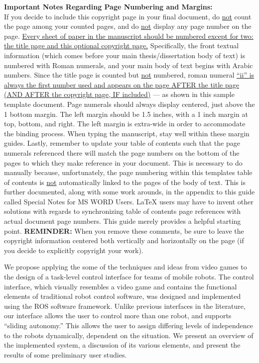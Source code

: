 \begin{thesiscopyrightpage}
\begin{singlespace}
{\small \textbf{Important Notes Regarding Page Numbering and Margins:}} \\
If you decide to include this copyright page in your final document, do
\uline{not} count the page among your counted pages, and do \uline{not} display
any page number on the page.  \uline{Every sheet of paper in the manuscript
should be numbered except for two:  the title page and this optional copyright
page.}  Specifically, the front textual information (which comes before your
main thesis/dissertation body of text) is numbered with Roman numerals, and
your main body of text begins with Arabic numbers.  Since the title page is
counted but \uline{not} numbered, roman numeral \uline{``ii'' is always the
first number used and appears on the page AFTER the title page (AND AFTER the
copyright page, IF included)} --- as shown in this sample template document.
Page numerals should always display centered, just above the 1 bottom margin.
The left margin should be 1.5 inches, with a 1 inch margin at top, bottom, and
right.  The left margin is extra-wide in order to accommodate the binding
process.  When typing the manuscript, stay well within these margin guides.
Lastly, remember to update your table of contents such that the page numerals
referenced there will match the page numbers on the bottom of the pages to
which they make reference in your document.  This is necessary to do manually
because, unfortunately, the page numbering within this templates table of
contents is \uline{not} automatically linked to the pages of the body of text.
This is further documented, along with some work arounds, in the appendix to
this guide called Special Notes for MS WORD Users.  \LaTeX{} users may have to
invent other solutions with regards to synchronizing table of contents page
references with actual document page numbers.  This guide merely provides a
helpful starting point.  \textbf{REMINDER:} When you remove these comments, be
sure to leave the copyright information centered both vertically and
horizontally on the page (if you decide to explicitly copyright your work).
\end{singlespace}
\fi
\end{thesiscopyrightpage}

\begin{thesisabstract}
We propose applying the some of the techniques and ideas from video games to the design of a task-level control interface for teams of mobile robots.  The control interface, which visually resembles a video game and contains the functional elements of traditional robot control software, was designed and implemented using the ROS software framework. Unlike previous interfaces in the literature, our interface allows the user to control more than one robot, and supports ``sliding autonomy.'' This allows the user to assign differing levels of independence to the robots dynamically, dependent on the situation.  We present an overview of the implemented system, a discussion of its various elements, and present the results of some preliminary user studies.
\end{thesisabstract}

